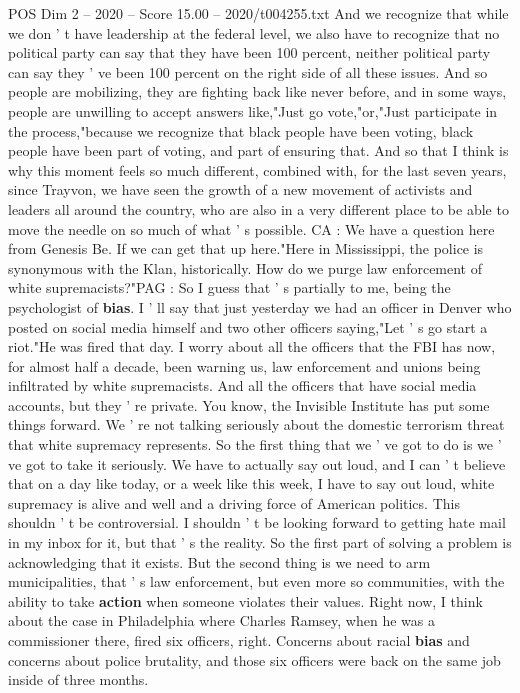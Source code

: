 \begin{textsample}{POS Dim 2 – 2020 – Score 15.00 – 2020/t004255.txt}
And we recognize that while we don ' t have leadership at the federal level, we also have to recognize that no political party can say that they have been 100 percent, neither political party can say they ' ve been 100 percent on the right side of all these issues.
And so people are mobilizing, they are fighting back like never before, and in some ways, people are unwilling to accept answers like,"Just go vote,"or,"Just participate in the process,"because we recognize that black people have been voting, black people have been part of voting, and part of ensuring that.
And so that I think is why this moment feels so much different, combined with, for the last seven years, since Trayvon, we have seen the growth of a new movement of activists and leaders all around the country, who are also in a very different place to be able to move the needle on so much of what ' s possible.
CA : We have a question here from Genesis Be.
If we can get that up here."Here in Mississippi, the police is synonymous with the Klan, historically.
How do we purge law enforcement of white supremacists?"PAG : So I guess that ' s partially to me, being the psychologist of \textbf{bias}.
I ' ll say that just yesterday we had an officer in Denver who posted on social media himself and two other officers saying,"Let ' s go start a riot."He was fired that day.
I worry about all the officers that the FBI has now, for almost half a decade, been warning us, law enforcement and unions being infiltrated by white supremacists.
And all the officers that have social media accounts, but they ' re private.
You know, the Invisible Institute has put some things forward.
We ' re not talking seriously about the domestic terrorism threat that white supremacy represents.
So the first thing that we ' ve got to do is we ' ve got to take it seriously.
We have to actually say out loud, and I can ' t believe that on a day like today, or a week like this week, I have to say out loud, white supremacy is alive and well and a driving force of American politics.
This shouldn ' t be controversial.
I shouldn ' t be looking forward to getting hate mail in my inbox for it, but that ' s the reality.
So the first part of solving a problem is acknowledging that it exists.
But the second thing is we need to arm municipalities, that ' s law enforcement, but even more so communities, with the ability to take \textbf{action} when someone violates their values.
Right now, I think about the case in Philadelphia where Charles Ramsey, when he was a commissioner there, fired six officers, right.
Concerns about racial \textbf{bias} and concerns about police brutality, and those six officers were back on the same job inside of three months.

\end{textsample}
